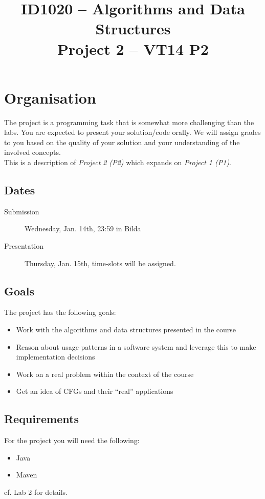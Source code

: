 \documentclass[11pt]{article}
\title{ID1020 -- Algorithms and Data Structures \\ Project 2 -- VT14 P2}
\author{}
\date{}                                           %
\begin{document}
\maketitle
\section{Organisation}
The project is a programming task that is somewhat more challenging than the labs. You are expected to present your solution/code orally. We will assign grades to you based on the quality of your solution and your understanding of the involved concepts.\\

This is a description of \emph{Project 2 (P2)} which expands on \emph{Project 1 (P1)}.

\subsection{Dates}
\begin{description}
\item[Submission] Wednesday, Jan. 14th, 23:59 in Bilda
\item[Presentation] Thursday, Jan. 15th, time-slots will be assigned.
\end{description}

\subsection{Goals}
The project has the following goals:
\begin{itemize}
\item Work with the algorithms and data structures presented in the course
\item Reason about usage patterns in a software system and leverage this to make implementation decisions
\item Work on a real problem within the context of the course
\item Get an idea of CFGs and their ``real'' applications
\end{itemize}

\subsection{Requirements}
\label{ssec:reqs}
For the project you will need the following:
\begin{itemize}
\item Java
\item Maven
\end{itemize}
cf. Lab 2 for details.
\end{document}
